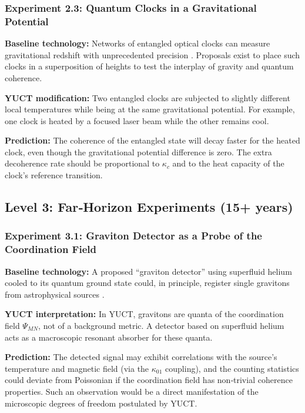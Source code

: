 \documentclass[12pt]{article}
\theoremstyle{remark}
\begin{document}
	\subsubsection{Experiment 2.3: Quantum Clocks in a Gravitational Potential}
	
	\textbf{Baseline technology:} Networks of entangled optical clocks can measure gravitational redshift with
	unprecedented precision \cite{Katori2021}.  
	Proposals exist to place such clocks in a superposition of heights to test the interplay of gravity and quantum
	coherence.
	
	\textbf{YUCT modification:} Two entangled clocks are subjected to slightly different local temperatures while
	being at the same gravitational potential.  
	For example, one clock is heated by a focused laser beam while the other remains cool.
	
	\textbf{Prediction:} The coherence of the entangled state will decay faster for the heated clock, even though
	the gravitational potential difference is zero.  
	The extra decoherence rate should be proportional to \(\kappa_c\) and to the heat capacity of the clock’s
	reference transition.
	
	\subsection{Level 3: Far‑Horizon Experiments (15+ years)}
	\label{subsec:far-tests}
	
	\subsubsection{Experiment 3.1: Graviton Detector as a Probe of the Coordination Field}
	
	\textbf{Baseline technology:} A proposed “graviton detector” using superfluid helium cooled to its quantum ground
	state could, in principle, register single gravitons from astrophysical sources \cite{Berezin2025}.
	
	\textbf{YUCT interpretation:} In YUCT, gravitons are quanta of the coordination field \(\Psi_{MN}\), not of a
	background metric.  
	A detector based on superfluid helium acts as a macroscopic resonant absorber for these quanta.
	
	\textbf{Prediction:} The detected signal may exhibit correlations with the source’s temperature and magnetic
	field (via the \(\kappa_{01}\) coupling), and the counting statistics could deviate from Poissonian if the
	coordination field has non‑trivial coherence properties.  
	Such an observation would be a direct manifestation of the microscopic degrees of freedom postulated by YUCT.
	
\end{document}

